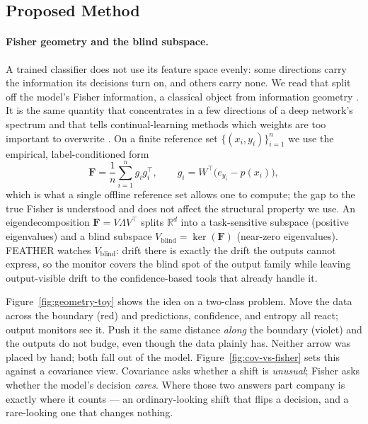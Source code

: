 \documentclass[sigconf,anonymous]{acmart}
\begin{document}
\subsection{Proposed Method}
\label{sec:proposed}

\paragraph{Fisher geometry and the blind subspace.}
A trained classifier does not use its feature space evenly: some directions
carry the information its decisions turn on, and others carry none. We read
that split off the model's Fisher information, a classical object from
information geometry \cite{amari1998natural}. It is the same quantity that
concentrates in a few directions of a deep network's spectrum
\cite{karakida2019universal} and that tells continual-learning methods which
weights are too important to overwrite \cite{kirkpatrick2017overcoming}. On a
finite reference set
$\{(x_i,y_i)\}_{i=1}^n$ we use the empirical, label-conditioned form
\begin{equation}
\mathbf{F} = \frac{1}{n}\sum_{i=1}^{n} g_i g_i^{\top}, \qquad
g_i = W^{\top}\bigl(e_{y_i}-p(x_i)\bigr),
\end{equation}
which is what a single offline reference set allows one to compute; the gap
to the true Fisher is understood \cite{kunstner2019empirical} and does not
affect the structural property we use. An eigendecomposition $\mathbf{F} = V
\Lambda V^{\top}$ splits $\mathbb{R}^d$ into a task-sensitive subspace
(positive eigenvalues) and a blind subspace $V_{\text{blind}} =
\ker(\mathbf{F})$ (near-zero eigenvalues). FEATHER watches $V_{\text{blind}}$:
drift there is exactly the drift the outputs cannot express, so the monitor
covers the blind spot of the output family while leaving output-visible drift
to the confidence-based tools that already handle it.

Figure~\ref{fig:geometry-toy} shows the idea on a two-class problem. Move the
data across the boundary (red) and predictions, confidence, and entropy all
react; output monitors see it. Push it the same distance \emph{along}
the boundary (violet) and the outputs do not budge, even though the data
plainly has. Neither arrow was placed by hand; both fall out of the model.
Figure~\ref{fig:cov-vs-fisher} sets this against a covariance view. Covariance
asks whether a shift is \emph{unusual}; Fisher asks whether the model's
decision \emph{cares}. Where those two answers part company is exactly where
it counts --- an ordinary-looking shift that flips a decision, and a
rare-looking one that changes nothing.
\end{document}
